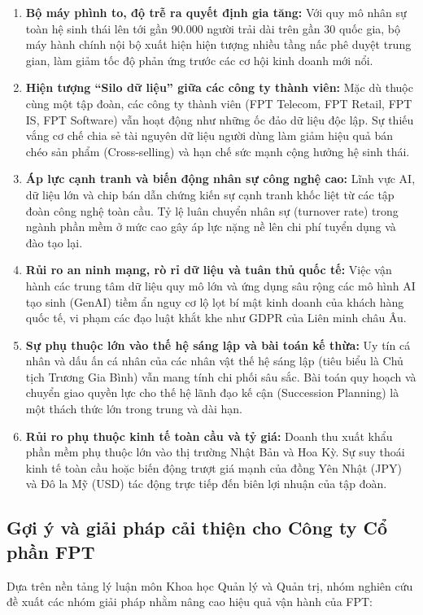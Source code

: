 \begin{enumerate}
    \item \textbf{Bộ máy phình to, độ trễ ra quyết định gia tăng:} Với quy mô nhân sự toàn hệ sinh thái lên tới gần 90.000 người trải dài trên gần 30 quốc gia, bộ máy hành chính nội bộ xuất hiện hiện tượng nhiều tầng nấc phê duyệt trung gian, làm giảm tốc độ phản ứng trước các cơ hội kinh doanh mới nổi.
    \item \textbf{Hiện tượng ``Silo dữ liệu'' giữa các công ty thành viên:} Mặc dù thuộc cùng một tập đoàn, các công ty thành viên (FPT Telecom, FPT Retail, FPT IS, FPT Software) vẫn hoạt động như những ốc đảo dữ liệu độc lập. Sự thiếu vắng cơ chế chia sẻ tài nguyên dữ liệu người dùng làm giảm hiệu quả bán chéo sản phẩm (Cross-selling) và hạn chế sức mạnh cộng hưởng hệ sinh thái.
    \item \textbf{Áp lực cạnh tranh và biến động nhân sự công nghệ cao:} Lĩnh vực AI, dữ liệu lớn và chip bán dẫn chứng kiến sự cạnh tranh khốc liệt từ các tập đoàn công nghệ toàn cầu. Tỷ lệ luân chuyển nhân sự (turnover rate) trong ngành phần mềm ở mức cao gây áp lực nặng nề lên chi phí tuyển dụng và đào tạo lại.
    \item \textbf{Rủi ro an ninh mạng, rò rỉ dữ liệu và tuân thủ quốc tế:} Việc vận hành các trung tâm dữ liệu quy mô lớn và ứng dụng sâu rộng các mô hình AI tạo sinh (GenAI) tiềm ẩn nguy cơ lộ lọt bí mật kinh doanh của khách hàng quốc tế, vi phạm các đạo luật khắt khe như GDPR của Liên minh châu Âu.
    \item \textbf{Sự phụ thuộc lớn vào thế hệ sáng lập và bài toán kế thừa:} Uy tín cá nhân và dấu ấn cá nhân của các nhân vật thế hệ sáng lập (tiêu biểu là Chủ tịch Trương Gia Bình) vẫn mang tính chi phối sâu sắc. Bài toán quy hoạch và chuyển giao quyền lực cho thế hệ lãnh đạo kế cận (Succession Planning) là một thách thức lớn trong trung và dài hạn.
    \item \textbf{Rủi ro phụ thuộc kinh tế toàn cầu và tỷ giá:} Doanh thu xuất khẩu phần mềm phụ thuộc lớn vào thị trường Nhật Bản và Hoa Kỳ. Sự suy thoái kinh tế toàn cầu hoặc biến động trượt giá mạnh của đồng Yên Nhật (JPY) và Đô la Mỹ (USD) tác động trực tiếp đến biên lợi nhuận của tập đoàn.
\end{enumerate}

\subsection{Gợi ý và giải pháp cải thiện cho Công ty Cổ phần FPT}
Dựa trên nền tảng lý luận môn Khoa học Quản lý và Quản trị, nhóm nghiên cứu đề xuất các nhóm giải pháp nhằm nâng cao hiệu quả vận hành của FPT:

